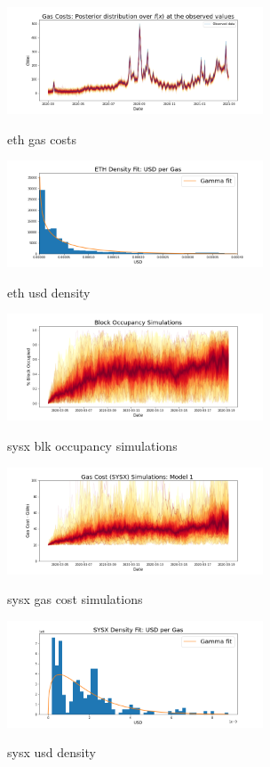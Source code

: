 \documentclass[peerreview]{ieeesyscoin}
\begin{document}
\begin{figure}[h!]
\includegraphics[width=3in]{img/eth_gas_costs.png}
\label{fig:eth_gas_costs}
\caption{eth gas costs} 
\end{figure} 

\begin{figure}[h!]
\includegraphics[width=3in]{img/eth_usd_density.png}
\label{fig:eth_usd_density}
\caption{eth usd density} 
\end{figure} 

\begin{figure}[h!]
\includegraphics[width=3in]{img/blk_occupancy_simulations.png}
\label{fig:blk_occupancy_simulations}
\caption{sysx blk occupancy simulations} 
\end{figure} 

\begin{figure}[h!]
\includegraphics[width=3in]{img/sysx_gas_costs_m1.png}
\label{fig:sysx_gas_costs_m1}
\caption{sysx gas cost simulations} 
\end{figure} 

\begin{figure}[h!]
\includegraphics[width=3in]{img/sysx_usd_density.png}
\label{fig:sysx_usd_density}
\caption{sysx usd density} 
\end{figure} 
\end{document}
